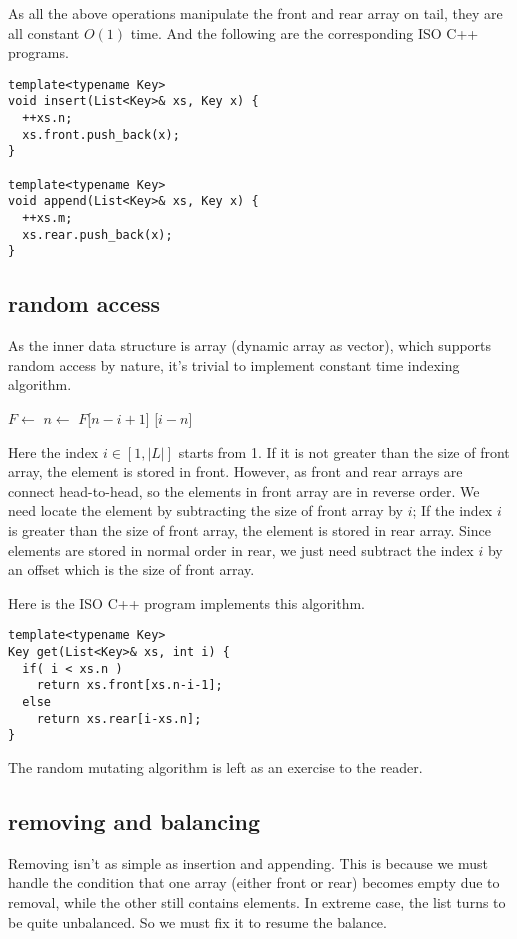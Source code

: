 \documentclass[UTF8]{article}
\begin{document}
As all the above operations manipulate the front and rear array on tail, they are all constant $O(1)$ time. And the following are the corresponding ISO C++ programs.

\begin{lstlisting}
template<typename Key>
void insert(List<Key>& xs, Key x) {
  ++xs.n;
  xs.front.push_back(x);
}

template<typename Key>
void append(List<Key>& xs, Key x) {
  ++xs.m;
  xs.rear.push_back(x);
}
\end{lstlisting}

\subsection{random access}
As the inner data structure is array (dynamic array as vector), which supports random access
by nature, it's trivial to implement constant time indexing algorithm.

\begin{algorithmic}
  \State $F \gets $ 
  \State $n \gets $ 
    \State \Return $F$[$n-i+1$]
  \Else
    \State {}[$i-n$]
  \EndIf
\EndFunction
\end{algorithmic}

Here the index $i \in [1, |L|]$ starts from 1. If it is not greater than the size of front
array, the element is stored in front. However, as front and rear arrays are connect head-to-head,
so the elements in front array are in reverse order. We need locate the element by subtracting
the size of front array by $i$; If the index $i$ is greater than the size of front array,
the element is stored in rear array. Since elements are stored in normal order in rear,
we just need subtract the index $i$ by an offset which is the size of front array.

Here is the ISO C++ program implements this algorithm.

\begin{lstlisting}
template<typename Key>
Key get(List<Key>& xs, int i) {
  if( i < xs.n )
    return xs.front[xs.n-i-1];
  else
    return xs.rear[i-xs.n];
}
\end{lstlisting}

The random mutating algorithm is left as an exercise to the reader.

\subsection{removing and balancing}
Removing isn't as simple as insertion and appending. This is because we must handle the
condition that one array (either front or rear) becomes empty due to removal, while the
other still contains elements. In extreme case, the list turns to be quite unbalanced.
So we must fix it to resume the balance.
\end{document}
